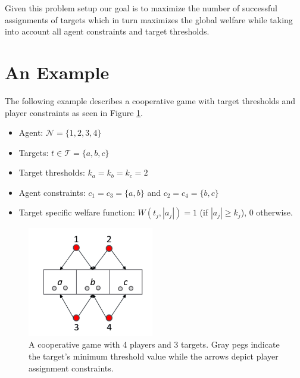 \documentclass[defaultstyle,12pt]{thesis}
\newcommand{\Pl}{\mathcal{N}} %
\newcommand{\Ta}{\mathcal{T}} %
\begin{document}
Given this problem setup our goal is to maximize the number of successful assignments of targets which in turn maximizes the global welfare while taking into account all agent constraints and target thresholds.

\section{An Example}\label{sec:example}
The following example describes a cooperative game with target thresholds and player constraints as seen in Figure \ref{fig:ex1}.
\begin{itemize}
	\item Agent: $\Pl = \{1,2,3,4\}$
	\item Targets: $t \in \Ta = \{a, b, c\}$
	\item Target thresholds: $k_a = k_b = k_c = 2$
	\item Agent constraints: $c_1 = c_3 = \{a, b\}$ and $c_2 = c_4 = \{b, c\}$
	\item Target specific welfare function: $W(t_j, |a_j|) = 1$ (if $|a_j| \geq k_j$), $0$ otherwise.
	
\end{itemize}
\begin{figure}[!htb]
	\centering\includegraphics[width=5.5cm]{../assets/ex1.png}
	\centering\caption{A cooperative game with 4 players and 3 targets. Gray pegs indicate the target's minimum threshold value while the arrows depict player assignment constraints.}\label{fig:ex1}
\end{figure}

\end{document}
